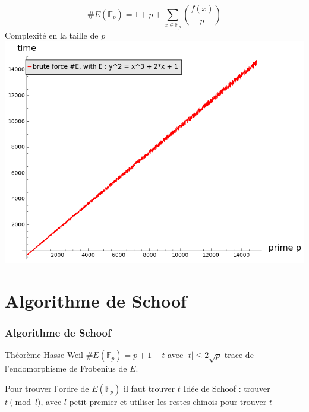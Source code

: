 \documentclass{beamer}
\begin{document}
\begin{frame}
\frametitle{}
\begin{equation*}
\#E(\mathbb{F}_p) = 1 + p +\sum_{x \in \mathbb{F}_p}\genfrac(){}{0}{f(x)}{p}
\end{equation*}
Complexité en la taille de $p$
\includegraphics[scale=0.4]{../pictures/brute_force_cputime.png} 
\end{frame}

\section{Algorithme de Schoof}
\begin{frame}
\frametitle{Algorithme de Schoof}

\begin{block}{Théorème Hasse-Weil}
$\#E(\mathbb{F}_p) = p + 1 - t$ avec $|t| \leq 2 \sqrt{p}$ trace de l'endomorphisme de Frobenius de $E$.
\end{block}
Pour trouver l'ordre de $E(\mathbb{F}_p)$ il faut trouver $t$
\newline
Idée de Schoof : trouver $t \pmod l$, avec $l$ petit premier et utiliser les restes chinois pour trouver $t$
\end{frame}
\end{document}

